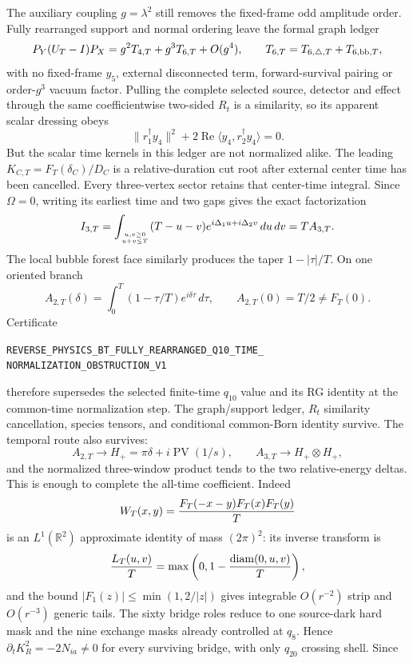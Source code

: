 \documentclass[11pt]{article}
\theoremstyle{definition}
\theoremstyle{remark}
\begin{document}
The auxiliary coupling \(g=\lambda^2\) still removes the fixed-frame odd
amplitude order.  Fully rearranged support and normal ordering leave the
formal graph ledger
\[
 P_Y(U_T-I)P_X=g^2T_{4,T}+g^3T_{6,T}+O(g^4),
 \qquad T_{6,T}=T_{6,\triangle,T}+T_{6,{\rm bb},T},
\]
with no fixed-frame $y_5$, external disconnected term, forward-survival
pairing or order-$g^3$ vacuum factor.  Pulling the complete selected source,
detector and effect through the same coefficientwise two-sided $R_t$ is a
similarity, so its apparent scalar dressing obeys
\[
 \lVert r_1^\dagger y_4\rVert^2
 +2\operatorname{Re}\langle y_4,r_2^\dagger y_4\rangle=0.
\]
But the scalar time kernels in this ledger are not normalized alike.  The
leading \(K_{C,T}=F_T(\delta_C)/D_C\) is a relative-duration cut root after
external center time has been cancelled.  Every three-vertex sector retains
that center-time integral.  Since \(\Omega=0\), writing its earliest time and
two gaps gives the exact factorization
\[
 I_{3,T}=\int_{u,v\ge0\atop u+v\le T}
 (T-u-v)e^{i\Delta_1u+i\Delta_2v}\,du\,dv=T A_{3,T}.
\]
The local bubble forest face similarly produces the taper
\(1-|\tau|/T\).  On one oriented branch
\[
 A_{2,T}(\delta)=\int_0^T(1-\tau/T)e^{i\delta\tau}\,d\tau,
 \qquad A_{2,T}(0)=T/2\ne F_T(0).
\]
Certificate
\par\noindent
\texttt{REVERSE\_PHYSICS\_BT\_FULLY\_REARRANGED\_Q10\_TIME\_}
\allowbreak\texttt{NORMALIZATION\_OBSTRUCTION\_V1}
\par\noindent
therefore supersedes the selected finite-time \(q_{10}\) value and its RG
identity at the common-time normalization step.  The graph/support ledger,
\(R_t\) similarity cancellation, species tensors, and conditional common-Born
identity survive.  The temporal route also survives:
\[
 A_{2,T}\to H_+=\pi\delta+i\operatorname{PV}(1/s),
 \qquad A_{3,T}\to H_+\otimes H_+,
\]
and the normalized three-window product tends to the two relative-energy
deltas.  This is enough to complete the all-time coefficient.  Indeed
\[
 W_T(x,y)={F_T(-x-y)F_T(x)F_T(y)\over T}
\]
is an \(L^1(\mathbb R^2)\) approximate identity of mass \((2\pi)^2\):
its inverse transform is
\[
 {L_T(u,v)\over T}
 =\max\left(0,1-{\operatorname{diam}(0,u,v)\over T}\right),
\]
and the bound \(\lvert F_1(z)\rvert\leq\min(1,2/\lvert z\rvert)\) gives
integrable \(O(r^{-2})\) strip and \(O(r^{-3})\) generic tails.
The sixty bridge roles reduce to one source-dark hard mask and the nine
exchange masks already controlled at \(q_8\).  Hence
\(\partial_tK_R^2=-2N_{ia}\ne0\) for every surviving bridge, with only
\(q_{20}\) crossing shell.  Since
\end{document}
